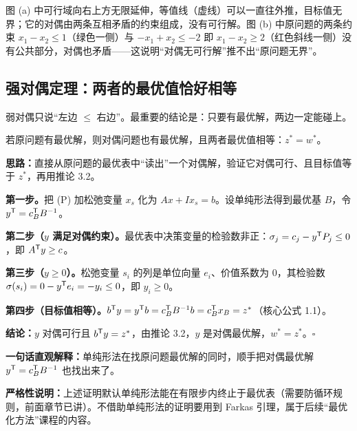 图 (a) 中可行域向右上方无限延伸，等值线（虚线）可以一直往外推，目标值无界；它的对偶由两条互相矛盾的约束组成，没有可行解。图 (b) 中原问题的两条约束 $x_1-x_2\le1$（绿色一侧）与 $-x_1+x_2\le-2$ 即 $x_1-x_2\ge2$（红色斜线一侧）没有公共部分，对偶也矛盾——这说明“对偶无可行解”推不出“原问题无界”。

\subsection{强对偶定理：两者的最优值恰好相等}

弱对偶只说“左边 $\le$ 右边”。最重要的结论是：只要有最优解，两边一定能碰上。

\begin{theorembox}
若原问题有最优解，则对偶问题也有最优解，且两者最优值相等：$z^*=w^*$。
\end{theorembox}

\begin{proofbox}
\textbf{思路：}直接从原问题的最优表中“读出”一个对偶解，验证它对偶可行、且目标值等于 $z^*$，再用推论 3.2。\par
\textbf{第一步。}把 (P) 加松弛变量 $x_s$ 化为 $Ax+Ix_s=b$。设单纯形法得到最优基 $B$，令 $y^{\mathsf T}=c_B^{\mathsf T} B^{-1}$。\par
\textbf{第二步（$y$ 满足对偶约束）。}最优表中决策变量的检验数非正：$\sigma_j=c_j-y^{\mathsf T} P_j\le0$，即 $A^{\mathsf T} y\ge c$。\par
\textbf{第三步（$y\ge0$）。}松弛变量 $s_i$ 的列是单位向量 $e_i$、价值系数为 0，其检验数 $\sigma(s_i)=0-y^{\mathsf T} e_i=-y_i\le0$，即 $y_i\ge0$。\par
\textbf{第四步（目标值相等）。}$b^{\mathsf T} y=y^{\mathsf T} b=c_B^{\mathsf T} B^{-1}b=c_B^{\mathsf T} x_B=z^*$（核心公式 1.1）。\par
\textbf{结论：}$y$ 对偶可行且 $b^{\mathsf T} y=z^*$，由推论 3.2，$y$ 是对偶最优解，$w^*=z^*$。\hfill$\square$\par
\textbf{一句话直观解释：}单纯形法在找原问题最优解的同时，顺手把对偶最优解 $y^{\mathsf T}=c_B^{\mathsf T} B^{-1}$ 也找出来了。\par
\textbf{严格性说明：}上述证明默认单纯形法能在有限步内终止于最优表（需要防循环规则，前面章节已讲）。不借助单纯形法的证明要用到 Farkas 引理，属于后续“最优化方法”课程的内容。
\end{proofbox}

